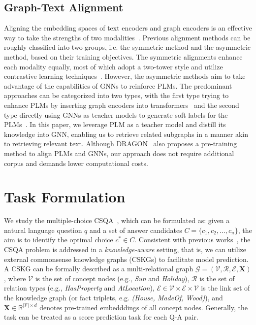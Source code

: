 \documentclass[runningheads]{llncs}
\begin{document}
\subsection{Graph-Text Alignment}
Aligning the embedding spaces of text encoders and graph encoders is an effective way to take the strengths of two modalities~\cite{ref:survey}. Previous alignment methods can be roughly classified into two groups, i.e. the symmetric method and the asymmetric method, based on their training objectives. The symmetric alignments enhance each modality equally, most of which adopt a two-tower style and utilize contrastive learning techniques~\cite{ref:safer,ref:congrat}. However, the asymmetric methods aim to take advantage of the capabilities of GNNs to reinforce PLMs. The predominant approaches can be categorized into two types, with the first type trying to enhance PLMs by inserting graph encoders into transformers~\cite{ref:patton,ref:yunzhu} and the second type directly using GNNs as teacher models to generate soft labels for the PLMs~\cite{ref:Heterogeneous}. In this paper, we leverage PLM as a teacher model and distill its knowledge into GNN, enabling us to retrieve related subgraphs in a manner akin to retrieving relevant text. Although DRAGON~\cite{ref:dragon} also proposes a pre-training method to align PLMs and GNNs, our approach does not require additional corpus and demands lower computational costs.

\section{Task Formulation}
We study the multiple-choice CSQA~\cite{ref:csqa,ref:obqa}, which can be formulated as: given a natural language question $q$ and a set of answer candidates $C = \{c_1, c_2, \dots, c_n\}$, the aim is to identify the optimal choice $c^* \in C$. Consistent with previous works~\cite{ref:kagnet}, the CSQA problem is addressed in a \emph{knowledge-aware} setting, that is, we can utilize external commonsense knowledge graphs (CSKGs) to facilitate model prediction. A CSKG can be formally described as a multi-relational graph $\mathcal{G} = (\mathcal{V}, \mathcal{R}, \mathcal{E}, \boldsymbol{X})$, where $\mathcal{V}$ is the set of concept nodes (e.g., \emph{Sun} and \emph{Holiday}), $\mathcal{R}$ is the set of relation types (e.g., \emph{HasProperty} and \emph{AtLocation}), $\mathcal{E} \in \mathcal{V} \times \mathcal{E} \times \mathcal{V}$ is the link set of the knowledge graph (or fact triplets, e.g. \emph{(House, MadeOf, Wood)}), and $\boldsymbol{X} \in \mathbb{R}^{\lvert \mathcal{V} \rvert \times d}$ denotes pre-trained embedddings of all concept nodes. Generally, the task can be treated as a score prediction task for each Q-A pair. 
\end{document}
